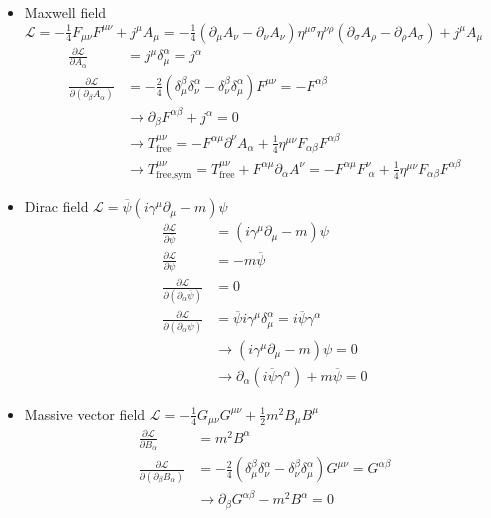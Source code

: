 \documentclass[../main.tex]{subfiles}
\begin{document}
\begin{itemize}
\item Maxwell field $\mathcal{L}=-\frac{1}{4}F_{\mu\nu}F^{\mu\nu}+j^\mu A_\mu=-\frac{1}{4}(\partial_\mu A_\nu-\partial_\nu A_\nu)\eta^{\mu\sigma}\eta^{\nu\rho}(\partial_\sigma A_\rho-\partial_\rho A_\sigma)+j^\mu A_\mu$
\begin{align}
\frac{\partial\mathcal{L}}{\partial A_\alpha}&=j^\mu\delta^\alpha_\mu=j^\alpha\\
\frac{\partial\mathcal{L}}{\partial(\partial_\beta A_\alpha)}&=-\frac{2}{4}(\delta^\beta_\mu\delta^\alpha_\nu-\delta^\beta_\nu\delta^\alpha_\mu)F^{\mu\nu}=-F^{\alpha\beta}\\
&\rightarrow\partial_\beta F^{\alpha\beta}+j^\alpha=0\\
&\rightarrow T^{\mu\nu}_\text{free}=-F^{\alpha\mu}\partial^\nu A_\alpha+\frac{1}{4}\eta^{\mu\nu}F_{\alpha\beta}F^{\alpha\beta}\\
&\rightarrow T^{\mu\nu}_\text{free,sym}=T^{\mu\nu}_\text{free}+F^{\alpha\mu}\partial_\alpha A^\nu=-F^{\alpha\mu}F^\nu_{\;\alpha}+\frac{1}{4}\eta^{\mu\nu}F_{\alpha\beta}F^{\alpha\beta}
\end{align}
\item Dirac field $\mathcal{L}=\overline{\psi}(i\gamma^\mu\partial_\mu-m)\psi$
\begin{align}
\frac{\partial\mathcal{L}}{\partial \overline\psi}&=(i\gamma^\mu\partial_\mu-m)\psi\\
\frac{\partial\mathcal{L}}{\partial \psi}&=-m\overline\psi\\
\frac{\partial\mathcal{L}}{\partial(\partial_\alpha \overline\psi)}&=0\\
\frac{\partial\mathcal{L}}{\partial(\partial_\alpha \psi)}&=\overline\psi i\gamma^\mu\delta^\alpha_\mu=i\overline\psi \gamma^\alpha\\
&\rightarrow (i\gamma^\mu\partial_\mu-m)\psi=0\\
&\rightarrow \partial_\alpha(i\overline\psi\gamma^\alpha)+m\overline\psi=0
\end{align}
\item Massive vector field $\mathcal{L}=-\frac{1}{4}G_{\mu\nu}G^{\mu\nu}+\frac{1}{2}m^2B_\mu B^\mu$
\begin{align}
\frac{\partial\mathcal{L}}{\partial B_\alpha}&=m^2B^\alpha\\
\frac{\partial\mathcal{L}}{\partial(\partial_\beta B_\alpha)}&=-\frac{2}{4}(\delta^\beta_\mu\delta^\alpha_\nu-\delta^\beta_\nu\delta^\alpha_\mu)G^{\mu\nu}=G^{\alpha\beta}\\
&\rightarrow\partial_\beta G^{\alpha\beta}-m^2B^\alpha=0
\end{align}

\end{itemize}
\end{document}
